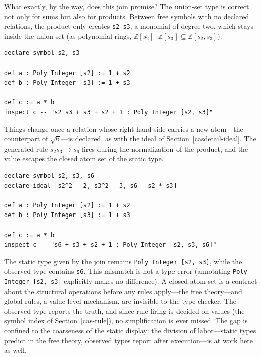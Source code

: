 What exactly, by the way, does this join promise?
The union-set type is correct not only for sums but also for products.
Between free symbols with no declared relations, the product only creates \lstinline{s2 s3}, a monomial of degree two, which stays inside the union set (as polynomial rings, $\mathbb{Z}[s_2] \cdot \mathbb{Z}[s_3] \subseteq \mathbb{Z}[s_2, s_3]$).
\begin{lstlisting}[language=egison,numbers=none]
declare symbol s2, s3

def a : Poly Integer [s2] := 1 + s2
def b : Poly Integer [s3] := 1 + s3

def c := a * b
inspect c -- "s2 s3 + s3 + s2 + 1 : Poly Integer [s2, s3]"
\end{lstlisting}
Things change once a relation whose right-hand side carries a new atom---the counterpart of $\sqrt{6}$---is declared, as with the ideal of Section~\ref{casdetail-ideal}.
The generated rule $s_2 s_3 \to s_6$ fires during the normalization of the product, and the value escapes the closed atom set of the static type.
\begin{lstlisting}[language=egison,numbers=none]
declare symbol s2, s3, s6
declare ideal [s2^2 - 2, s3^2 - 3, s6 - s2 * s3]

def a : Poly Integer [s2] := 1 + s2
def b : Poly Integer [s3] := 1 + s3

def c := a * b
inspect c -- "s6 + s3 + s2 + 1 : Poly Integer [s2, s3, s6]"
\end{lstlisting}
The static type given by the join remains \lstinline{Poly Integer [s2, s3]}, while the observed type contains \lstinline{s6}.
This mismatch is not a type error (annotating \lstinline{Poly Integer [s2, s3]} explicitly makes no difference).
A closed atom set is a contract about the structural operations before any rules apply---the free theory---and global rules, a value-level mechanism, are invisible to the type checker.
The observed type reports the truth, and since rule firing is decided on values (the symbol index of Section~\ref{cas-rule}), no simplification is ever missed.
The gap is confined to the coarseness of the static display: the division of labor---static types predict in the free theory, observed types report after execution---is at work here as well.


